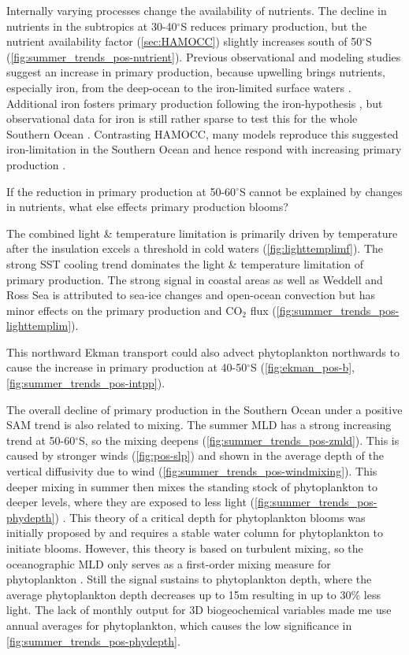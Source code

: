 Internally varying processes change the availability of nutrients. 
The decline in nutrients in the subtropics at 30-40$^\circ$S reduces primary production, but the nutrient availability factor (\autoref{sec:HAMOCC}) slightly increases south of 50$^\circ$S (\autoref{fig:summer_trends_pos-nutrient}).
Previous observational and modeling studies suggest an increase in primary production, because upwelling brings nutrients, especially iron, from the deep-ocean to the iron-limited surface waters \citep{Lovenduski2005,Hauck2013,wang2012,Tagliabue2014}. Additional iron fosters primary production following the iron-hypothesis \citep{Martin1990Nature,Martin1990}, but observational data for iron is still rather sparse to test this for the whole Southern Ocean \citep{Tagliabue2014}. Contrasting \acs{HAMOCC}, many models reproduce this suggested iron-limitation in the Southern Ocean and hence respond with increasing primary production \citep{wang2012,Hauck2013}.  \newline

If the reduction in primary production at 50-60$^\circ$S cannot be explained by changes in nutrients, what else effects primary production blooms?

The combined light \& temperature limitation is primarily driven by temperature after the insulation excels a threshold in cold waters (\autoref{fig:lighttemplimf}). The strong \acs{SST} cooling trend dominates the light \& temperature limitation of primary production. The strong signal in coastal areas as well as Weddell and Ross Sea is attributed to sea-ice changes and open-ocean convection but has minor effects on the primary production and CO$_2$ flux (\autoref{fig:summer_trends_pos-lighttemplim}). 

This northward Ekman transport could also advect phytoplankton northwards to cause the increase in primary production at 40-50$^\circ$S (\autoref{fig:ekman_pos-b}, \ref{fig:summer_trends_pos-intpp}).

The overall decline of primary production in the Southern Ocean under a positive \acs{SAM} trend is also related to mixing. The summer \ac{MLD} has a strong increasing trend at 50-60$^\circ$S, so the mixing deepens (\autoref{fig:summer_trends_pos-zmld}). This is caused by stronger winds (\autoref{fig:pos-slp}) and shown in the average depth of the vertical diffusivity due to wind (\autoref{fig:summer_trends_pos-windmixing}). This deeper mixing in summer then mixes the standing stock of phytoplankton to deeper levels, where they are exposed to less light (\autoref{fig:summer_trends_pos-phydepth}) \citep{Margalef1997}. This theory of a critical depth for phytoplankton blooms was initially proposed by \cite{Sverdrup1953} and requires a stable water column for phytoplankton to initiate blooms. However, this theory is based on turbulent mixing, so the oceanographic \acs{MLD} only serves as a first-order mixing measure for phytoplankton \citep{Franks2014}. Still the signal sustains to phytoplankton depth, where the average phytoplankton depth decreases up to 15m resulting in up to 30\% less light. The lack of monthly output for 3D biogeochemical variables made me use annual averages for phytoplankton, which causes the low significance in \autoref{fig:summer_trends_pos-phydepth}. 

